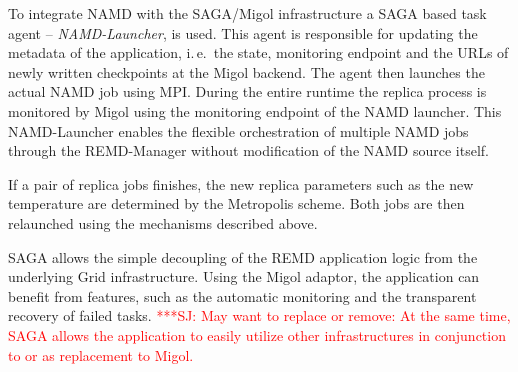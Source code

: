 \documentclass[times, 10pt, twocolumn]{article}
\newcommand{\jhanote}[1]{ {\textcolor{red} { ***SJ: #1 }}}
\newcommand{\jhanote}[1]{}
\begin{document}
To integrate NAMD with the SAGA/Migol infrastructure a SAGA based task
agent -- {\it NAMD-Launcher}, is used.  This agent is responsible for
updating the metadata of the application, i.\,e.\ the state,
monitoring endpoint and the URLs of newly written checkpoints at the
Migol backend.  The agent then launches the actual NAMD job using
MPI. During the entire runtime the replica process is monitored by
Migol using the monitoring endpoint of the NAMD launcher. This
NAMD-Launcher enables the flexible orchestration of multiple NAMD jobs
through the REMD-Manager without modification of the NAMD source
itself.


If a pair of replica jobs finishes, the new replica parameters such as
the new temperature are determined by the Metropolis scheme.  Both
jobs are then relaunched using the mechanisms described above.

SAGA allows the simple decoupling of the REMD application logic from
the underlying Grid infrastructure. Using the Migol adaptor, the
application can benefit from features, such as the automatic
monitoring and the transparent recovery of failed tasks.  \jhanote{May
  want to replace or remove: At the same time, SAGA allows the
  application to easily utilize other infrastructures in conjunction
  to or as replacement to Migol.}


                                             
\end{document}
